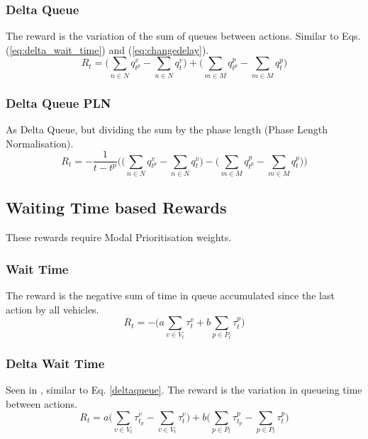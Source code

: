 \documentclass[conference]{IEEEtran}
\begin{document}
\subsubsection{Delta Queue}
The reward is the variation of the sum of queues between actions.
Similar to Eqs. (\ref{eq:delta_wait_time}) and (\ref{eq:changedelay}).
\begin{equation}
    R_t =  \bigg( \sum_{n \in N} q^v_{t^p} -\sum_{n \in N} q^v_{t} \bigg) +  \bigg( \sum_{m \in M} q^p_{t^p} - \sum_{m \in M} q^p_{t} \bigg)
    \label{deltaqueue}
\end{equation}

\subsubsection{Delta Queue PLN}
As Delta Queue, but dividing the sum by the phase length (Phase Length Normalisation).
\begin{equation}
    R_t = - \frac{1}{t-t^p} \bigg(  \big( \sum_{n \in N} q^v_{t^p} - \sum_{n \in N} q^v_{t} \big) - 
    \big(  \sum_{m \in M} q^p_{t^p}  - \sum_{m \in M} q^p_{t} \big) \bigg)
    \label{queuepln}
\end{equation}

\subsection{Waiting Time based Rewards}
These rewards require Modal Prioritisation weights.
\subsubsection{Wait Time}
The reward is the negative sum of time in queue accumulated since the last action by all vehicles. 
\begin{equation}
R_t = - \bigg(a \sum_{v \in V_t} \tau^v_{t} + b \sum_{p \in P_t} \tau^p_{t} \bigg)
\label{eq:wait_time}
\end{equation}

\subsubsection{Delta Wait Time}
Seen in \cite{liang2018}, similar to Eq. \ref{deltaqueue}. The reward is the variation in queueing time between actions.
\begin{equation}
R_t = a \bigg( \sum_{v \in V_t} \tau^v_{t_p} -  \sum_{v \in V_t} \tau^v_{t} \bigg) + b \bigg( \sum_{p \in P_t} \tau^p_{t_p} -  \sum_{p \in P_t} \tau^p_{t} \bigg)
\label{eq:delta_wait_time}
\end{equation}
\end{document}

